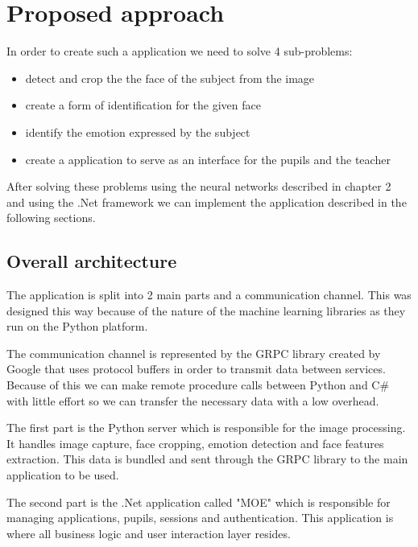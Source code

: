 \documentclass[runningheads,a4paper,11pt]{report}
\begin{document}
\chapter{Proposed approach}
\label{chapter:proposedApproach}

In order to create such a application we need to solve 4 sub-problems:
\begin{itemize}
  \item detect and crop the the face of the subject from the image
  \item create a form of identification for the given face
  \item identify the emotion expressed by the subject
  \item create a application to serve as an interface for the pupils and the teacher
\end{itemize}

After solving these problems using the neural networks described in chapter 2 and using the .Net framework we can implement the application described in the following sections.

\pagebreak
\section{Overall architecture}
\label{section:overallArchitecture}

The application is split into 2 main parts and a communication channel. This was designed this way because of the nature of the machine learning libraries as they run on the Python platform. 

The communication channel is represented by the GRPC library created by Google that uses protocol buffers in order to transmit data between services. Because of this we can make remote procedure calls between Python and C\# with little effort so we can transfer the necessary data with a low overhead.

The first part is the Python server which is responsible for the image processing. It handles image capture, face cropping, emotion detection and face features extraction. This data is bundled and sent through the GRPC library to the main application to be used.

The second part is the .Net application called "MOE" which is responsible for managing applications, pupils, sessions and authentication. This application is where all business logic and user interaction layer resides.
\end{document}
